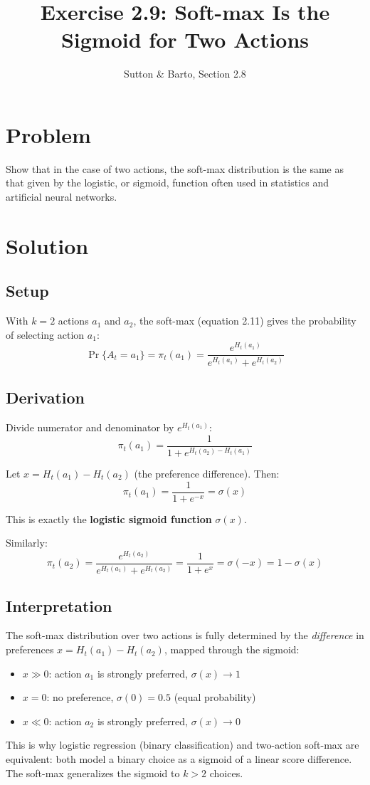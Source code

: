 \documentclass[11pt]{article}
\title{Exercise 2.9: Soft-max Is the Sigmoid for Two Actions}
\author{Sutton \& Barto, Section 2.8}
\date{}
\begin{document}
\maketitle

\section*{Problem}

Show that in the case of two actions, the soft-max distribution is the same
as that given by the logistic, or sigmoid, function often used in statistics
and artificial neural networks.

\section*{Solution}

\subsection*{Setup}

With $k = 2$ actions $a_1$ and $a_2$, the soft-max (equation 2.11) gives the probability of
selecting action $a_1$:
\[
    \Pr\{A_t = a_1\} = \pi_t(a_1)
    = \frac{e^{H_t(a_1)}}{e^{H_t(a_1)} + e^{H_t(a_2)}}
\]

\subsection*{Derivation}

Divide numerator and denominator by $e^{H_t(a_1)}$:
\[
    \pi_t(a_1) = \frac{1}{1 + e^{H_t(a_2) - H_t(a_1)}}
\]

Let $x = H_t(a_1) - H_t(a_2)$ (the preference difference). Then:
\[
    \boxed{\pi_t(a_1) = \frac{1}{1 + e^{-x}} = \sigma(x)}
\]

This is exactly the \textbf{logistic sigmoid function} $\sigma(x)$.

Similarly:
\[
    \pi_t(a_2) = \frac{e^{H_t(a_2)}}{e^{H_t(a_1)} + e^{H_t(a_2)}}
    = \frac{1}{1 + e^{x}} = \sigma(-x) = 1 - \sigma(x)
\]

\subsection*{Interpretation}

The soft-max distribution over two actions is fully determined by the
\emph{difference} in preferences $x = H_t(a_1) - H_t(a_2)$, mapped through
the sigmoid:
\begin{itemize}
    \item $x \gg 0$: action $a_1$ is strongly preferred, $\sigma(x) \to 1$
    \item $x = 0$: no preference, $\sigma(0) = 0.5$ (equal probability)
    \item $x \ll 0$: action $a_2$ is strongly preferred, $\sigma(x) \to 0$
\end{itemize}

This is why logistic regression (binary classification) and two-action
soft-max are equivalent: both model a binary choice as a sigmoid of a
linear score difference. The soft-max generalizes the sigmoid to $k > 2$
choices.
\end{document}
